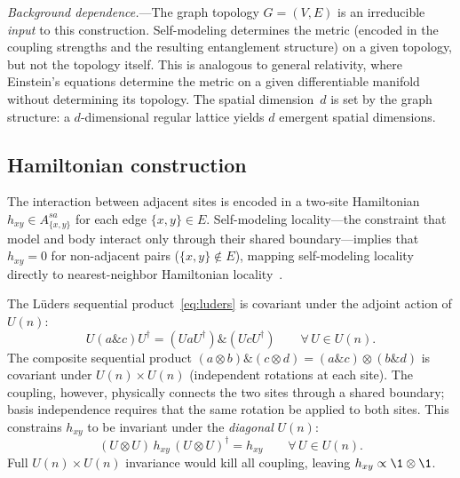 \emph{Background dependence.}---The graph topology $G = (V, E)$ is an
irreducible \emph{input} to this construction.  Self-modeling
determines the metric (encoded in the coupling strengths and the
resulting entanglement structure) on a given topology, but not the
topology itself.  This is analogous to general relativity, where
Einstein's equations determine the metric on a given differentiable
manifold without determining its topology.  The spatial dimension~$d$
is set by the graph structure: a $d$-dimensional regular lattice
yields $d$ emergent spatial dimensions.

\subsection{Hamiltonian construction}
\label{sec:hamiltonian}

The interaction between adjacent sites is encoded in a two-site
Hamiltonian $h_{xy} \in A_{\{x,y\}}^{sa}$ for each edge
$\{x, y\} \in E$.  Self-modeling locality---the constraint that model
and body interact only through their shared boundary---implies that
$h_{xy} = 0$ for non-adjacent pairs ($\{x,y\} \notin E$), mapping
self-modeling locality directly to nearest-neighbor Hamiltonian
locality~\cite{Paper5}.

The L\"uders sequential product~\eqref{eq:luders} is covariant under
the adjoint action of $U(n)$:
\begin{equation}
  U(a \mathbin{\&} c)U^\dagger = (UaU^\dagger) \mathbin{\&} (UcU^\dagger)
  \qquad \forall\, U \in U(n).
  \label{eq:covariance}
\end{equation}
The composite sequential product
$(a \otimes b) \mathbin{\&} (c \otimes d) = (a \mathbin{\&} c) \otimes
(b \mathbin{\&} d)$ is covariant under $U(n) \times U(n)$ (independent
rotations at each site).  The coupling, however, physically connects
the two sites through a shared boundary; basis independence requires
that the same rotation be applied to both sites.  This constrains
$h_{xy}$ to be invariant under the \emph{diagonal} $U(n)$:
\begin{equation}
  (U \otimes U)\, h_{xy}\, (U \otimes U)^\dagger = h_{xy}
  \qquad \forall\, U \in U(n).
  \label{eq:diagonal-invariance}
\end{equation}
Full $U(n) \times U(n)$ invariance would kill all coupling, leaving
$h_{xy} \propto \1 \otimes \1$.

